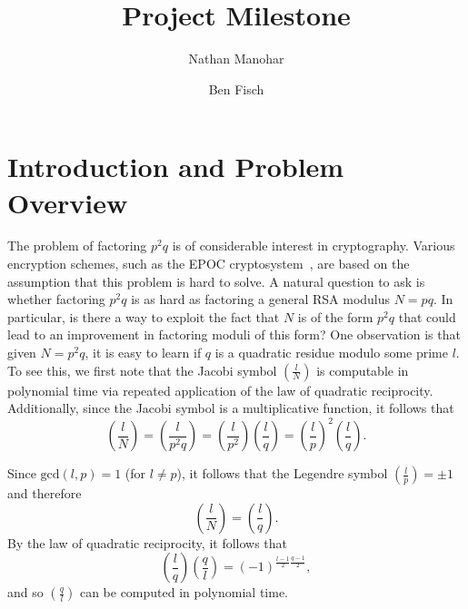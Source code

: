 \documentclass[letterpaper,twocolumn,10pt]{article}
\begin{document}
\date{}

\title{\Large \bf Project Milestone}

\author{
{\rm Nathan Manohar}\\
\and
{\rm Ben Fisch}\\
} %

\maketitle

\thispagestyle{empty}



\section{Introduction and Problem Overview}

The problem of factoring $p^2 q$ is of considerable interest in cryptography. Various encryption schemes, such as the EPOC cryptosystem~\cite{Okamoto}, are based on the assumption that this problem is hard to solve. A natural question to ask is whether factoring $p^2q$ is as hard as factoring a general RSA modulus $N = pq$. In particular, is there a way to exploit the fact that $N$ is of the form $p^2q$ that could lead to an improvement in factoring moduli of this form? One observation is that given $N = p^2q$, it is easy to learn if $q$ is a quadratic residue modulo some prime $l$. To see this, we first note that the Jacobi symbol $\left(\frac{l}{N}\right)$ is computable in polynomial time via repeated application of the law of quadratic reciprocity. Additionally, since the Jacobi symbol is a multiplicative function, it follows that
\[
\left(\frac{l}{N}\right) = \left(\frac{l}{p^2q}\right) = \left(\frac{l}{p^2}\right) \left(\frac{l}{q}\right) = \left(\frac{l}{p}\right)^2 \left(\frac{l}{q}\right).
\]

Since $\text{gcd}(l,p) = 1$ (for $l \ne p$), it follows that the Legendre symbol $\left(\frac{l}{p}\right) = \pm 1$ and therefore
\[
\left(\frac{l}{N}\right) = \left(\frac{l}{q}\right).
\]
By the law of quadratic reciprocity, it follows that
\[
\left(\frac{l}{q}\right) \left(\frac{q}{l}\right) = (-1)^{\frac{l-1}{2} \frac{q-1}{2}}, 
\]
and so $\left(\frac{q}{l}\right)$ can be computed in polynomial time.
\end{document}
